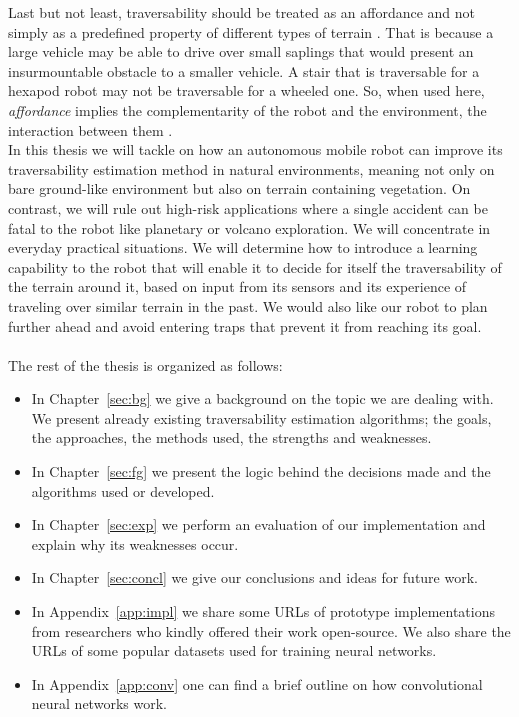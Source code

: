 \documentclass[12pt,a4paper,table,dvipsnames,tikz]{report}
\newcommand{\term}{\textit}
\newcommand{\acronym}{\MakeUppercase}
\begin{document}
	Last but not least, traversability should be treated as an affordance and 
	not simply as a predefined property of different types of terrain \citep{Kim}. 
	That is because a large vehicle may be able to drive over small saplings that 
	would present an insurmountable obstacle to a smaller vehicle. A stair that is 
	traversable for a hexapod robot may not be traversable for a wheeled one. So, 
	when used here, \term{affordance} implies the complementarity of the robot and 
	the environment, the interaction between them \citep{Ugur}.
	\\
	
	In this thesis we will tackle on how an autonomous mobile robot can improve its 
	traversability estimation method in natural environments, meaning not 
	only on bare ground-like environment but also on terrain containing vegetation. 
	On contrast, we will rule out high-risk applications where a single accident can 
	be fatal to the robot like planetary or volcano exploration. We will concentrate 
	in everyday practical situations. We will determine how to introduce a learning 
	capability to the robot that will enable it to decide for itself the 
	traversability of the terrain around it, based on input from its sensors 
	and its experience of traveling over similar terrain in the past. We would also 
	like our robot to plan further ahead and avoid entering traps that prevent it 
	from reaching its goal.
	\\\\
	
	The rest of the thesis is organized as follows:
	\begin{itemize}
		\item In Chapter~\ref{sec:bg} we give a background on the topic we are dealing 
		with. We present already existing traversability estimation algorithms; the 
		goals, the approaches, the methods used, the strengths and weaknesses. 
		\item In Chapter~\ref{sec:fg} we present the logic behind the decisions made 
		and the algorithms used or developed.
		\item In Chapter~\ref{sec:exp} we perform an evaluation of our implementation 
		and explain why its weaknesses occur.
		\item In Chapter~\ref{sec:concl} we give our conclusions and ideas for future 
		work.
		\item In Appendix~\ref{app:impl} we share some \acronym{url}s of prototype 
		implementations from researchers who kindly offered their work open-source. 
		We also share the \acronym{url}s of some popular datasets used for training
		neural networks.
		\item In Appendix~\ref{app:conv} one can find a brief outline on how 
		convolutional neural networks work.
	\end{itemize}
	
\end{document}
